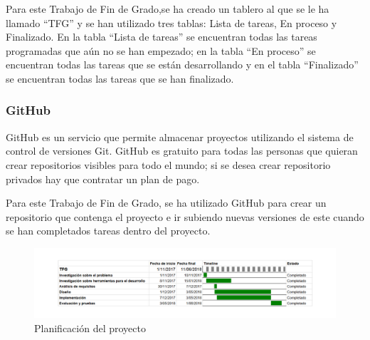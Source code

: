 Para este Trabajo de Fin de Grado,se ha creado un tablero al que se le ha llamado \enquote{TFG} y se han utilizado tres tablas: Lista de tareas, En proceso y Finalizado. En la tabla \enquote{Lista de tareas} se encuentran todas las tareas programadas que aún no se han empezado; en la tabla \enquote{En proceso} se encuentran todas las tareas que se están desarrollando y en el tabla \enquote{Finalizado} se encuentran todas las tareas que se han finalizado.
\subsubsection{GitHub}
GitHub \cite{github} es un servicio que permite almacenar proyectos utilizando el sistema de control de versiones Git. GitHub es gratuito para todas las personas que quieran crear repositorios visibles para todo el mundo; si se desea crear repositorio privados hay que contratar un plan de pago.\newline

Para este Trabajo de Fin de Grado, se ha utilizado GitHub para crear un repositorio que contenga el proyecto e ir subiendo nuevas versiones de este cuando se han completados tareas dentro del proyecto.\newline
\newpage
\begin{figure}[H]
	\centering
	\includegraphics[scale=0.55,angle=90]{imagenes/Gantt.png}
	\caption{Planificación del proyecto}
	\label{fig:gantt}
\end{figure}
